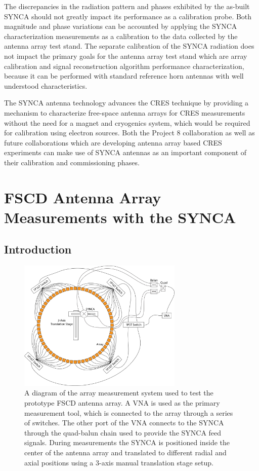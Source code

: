 The discrepancies in the radiation pattern and phases exhibited by the as-built SYNCA should not greatly impact its performance as a calibration probe. Both magnitude and phase variations can be accounted by applying the SYNCA characterization measurements as a calibration to the data collected by the antenna array test stand. The separate calibration of the SYNCA radiation does not impact the primary goals for the antenna array test stand which are array calibration and signal reconstruction algorithm performance characterization, because it can be performed with standard reference horn antennas with well understood characteristics.

The SYNCA antenna technology advances the CRES technique by providing a mechanism to characterize free-space antenna arrays for CRES measurements without the need for a magnet and cryogenics system, which would be required for calibration using electron sources. Both the Project 8 collaboration as well as future collaborations which are developing antenna array based CRES experiments can make use of SYNCA antennas as an important component of their calibration and commissioning phases.

\section{FSCD Antenna Array Measurements with the SYNCA}
\label{sec:chap5-fscd-array-measurements}

\subsection{Introduction}
\begin{figure}[htbp]
    \centering
    \includegraphics[width=0.7\textwidth]{figs/Chapter-5/230410_jugaad_system.png}
    \caption{A diagram of the array measurement system used to test the prototype FSCD antenna array. A VNA is used as the primary measurement tool, which is connected to the array through a series of switches. The other port of the VNA connects to the SYNCA through the quad-balun chain used to provide the SYNCA feed signals. During measurements the SYNCA is positioned inside the center of the antenna array and translated to different radial and axial positions using a 3-axis manual translation stage setup.}
    \label{fig:jugaad_system}
\end{figure}

